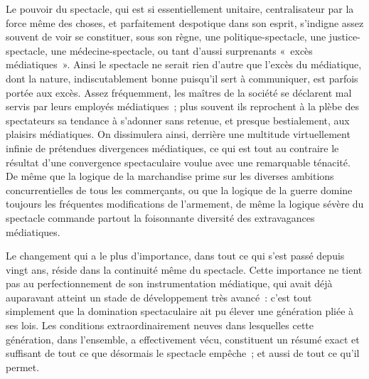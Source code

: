 \documentclass[french,twoside]{book} %
\def\mednobreak{\ifdim\lastskip<\medskipamount
  \removelastskip\nopagebreak\medskip\fi}
\newcommand{\labelblock}[1]{\medbreak{\noindent\color{rubric}\bfseries #1}\par\mednobreak}
\begin{document}
Le pouvoir du spectacle, qui est si essentiellement unitaire, centralisateur par la force même des choses, et parfaitement despotique dans son esprit, s’indigne assez souvent de voir se constituer, sous son règne, une politique-spectacle, une justice-spectacle, une médecine-spectacle, ou tant d’aussi surprenants « excès médiatiques ». Ainsi le spectacle ne serait rien d’autre que l’excès du médiatique, dont la nature, indiscutablement bonne puisqu’il sert à communiquer, est parfois portée aux excès. Assez fréquemment, les maîtres de la société se déclarent mal servis par leurs employés médiatiques ; plus souvent ils reprochent à la plèbe des spectateurs sa tendance à s’adonner sans retenue, et presque bestialement, aux plaisirs médiatiques. On dissimulera ainsi, derrière une multitude virtuellement infinie de prétendues divergences médiatiques, ce qui est tout au contraire le résultat d’une convergence spectaculaire voulue avec une remarquable ténacité. De même que la logique de la marchandise prime sur les diverses ambitions concurrentielles de tous les commerçants, ou que la logique de la guerre domine toujours les fréquentes modifications de l’armement, de même la logique sévère du spectacle commande partout la foisonnante diversité des extravagances médiatiques.\par
Le changement qui a le plus d’importance, dans tout ce qui s’est passé depuis vingt ans, réside dans la continuité même du spectacle. Cette importance ne tient pas au perfectionnement de son instrumentation médiatique, qui avait déjà auparavant atteint un stade de développement très avancé : c’est tout simplement que la domination spectaculaire ait pu élever une génération pliée à ses lois. Les conditions extraordinairement neuves dans lesquelles cette génération, dans l’ensemble, a effectivement vécu, constituent un résumé exact et suffisant de tout ce que désormais le spectacle empêche ; et aussi de tout ce qu’il permet.\par

\labelblock{IV}
\end{document}
